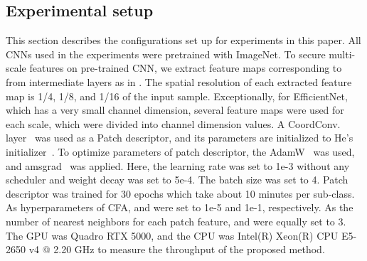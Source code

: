\documentclass[10pt,twocolumn,letterpaper]{article}
\begin{document}
    \subsection{Experimental setup}
        This section describes the configurations set up for experiments in this paper. 
        All CNNs used in the experiments were pretrained with ImageNet.
        To secure multi-scale features on pre-trained CNN, we extract feature maps corresponding to  from intermediate layers as in \cite{fpn}.
        The spatial resolution of each extracted feature map is 1/4, 1/8, and 1/16 of the input sample.
        Exceptionally, for EfficientNet, which has a very small channel dimension, several feature maps were used for each scale, which were divided into channel dimension values.
        A  CoordConv. layer~\cite{coordconv} was used as a Patch descriptor, and its parameters are initialized to He's initializer~\cite{he-init}. 
        To optimize parameters of patch descriptor, the AdamW~\cite{adamw} was used, and amsgrad~\cite{amsgrad} was applied. 
        Here, the learning rate was set to 1e-3 without any scheduler and weight decay was set to 5e-4. 
        The batch size was set to 4.
        Patch descriptor was trained for 30 epochs which take about 10 minutes per sub-class.
        As hyperparameters of CFA,  and  were set to 1e-5 and 1e-1, respectively.
        As the number of nearest neighbors for each patch feature,  and  were equally set to 3.
        The GPU was Quadro RTX 5000, and the CPU was Intel(R) Xeon(R) CPU E5-2650 v4 @ 2.20 GHz to measure the throughput of the proposed method.
        
\end{document}
